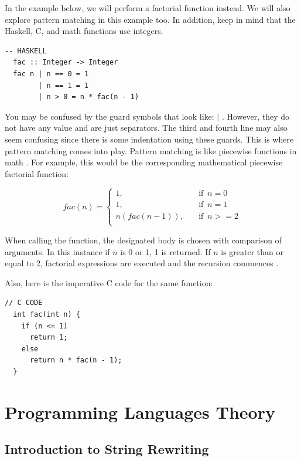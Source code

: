 \documentclass{article}
\begin{document}
\medskip\noindent
In the example below, we will perform a factorial function instead. We will also explore pattern matching in this example too. In addition, keep in mind that the Haskell, C, and math functions use integers.

\begin{lstlisting}[style=HaskellStyle]
  -- HASKELL
  fac :: Integer -> Integer
  fac n | n == 0 = 1
        | n == 1 = 1
        | n > 0 = n * fac(n - 1)
  \end{lstlisting}

\medskip\noindent
You may be confused by the guard symbols that look like: $|$ \cite{FAC}. However, they do not have any value and are just separators. The third and fourth line may also seem confusing since there is some indentation using these guards. This is where pattern matching comes into play. Pattern matching is like piecewise functions in math \cite{PM}. For example, this would be the corresponding mathematical piecewise factorial function:


\begin{equation*}
  fac(n)=\begin{cases}
      1, \quad &\text{if } \, n = 0 \\
      1, \quad &\text{if } \, n = 1 \\
      n(fac(n-1)), \quad &\text{if } \, n >= 2 \\
    \end{cases}
  \end{equation*}

\medskip\noindent
When calling the function, the designated body is chosen with comparison of arguments. In this instance if $n$ is 0 or 1, 1 is returned. If $n$ is greater than or equal to 2, factorial expressions are executed and the recursion commences \cite{HR}.

\medskip\noindent
Also, here is the imperative C code for the same function:

\begin{lstlisting}[style=CStyle]
  // C CODE
  int fac(int n) {
    if (n <= 1)
      return 1;
    else
      return n * fac(n - 1);
  }
  \end{lstlisting}

\section{Programming Languages Theory}
\label{sec:PLT}

\subsection{Introduction to String Rewriting}
\end{document}
